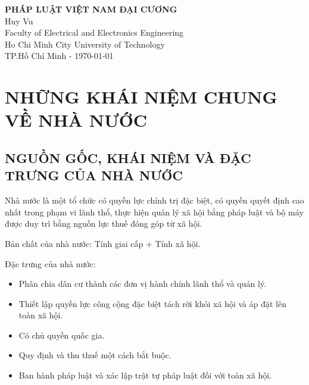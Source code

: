 \documentclass[12pt, a4paper]{article}
\begin{document}
\begin{titlepage}
    \centering
    \vspace*{1in}

    {\LARGE \bfseries PHÁP LUẬT VIỆT NAM ĐẠI CƯƠNG}\\[1.5cm]

    {\large Huy Vu}\\[0.5cm]
    {\large Faculty of Electrical and Electronics Engineering}\\
    {\large Ho Chi Minh City University of Technology}\\[2cm]

    {\large TP.Hồ Chí Minh - \today}

    \vfill
\end{titlepage}
{
  \tableofcontents
}
\newpage
\section{NHỮNG KHÁI NIỆM CHUNG VỀ NHÀ NƯỚC}
\subsection{NGUỒN GỐC, KHÁI NIỆM VÀ ĐẶC TRƯNG CỦA NHÀ NƯỚC}
Nhà nước là một tổ chức có quyền lực chính trị đặc biệt, có quyền quyết định cao nhất trong phạm vi lãnh thổ, thực hiện quản lý xã hội bằng pháp luật và bộ máy được duy trì bằng nguồn lực thuế đóng góp từ xã hội.

Bản chất của nhà nước: Tính giai cấp + Tính xã hội.

Đặc trưng của nhà nước:
\begin{itemize}
  \item Phân chia dân cư thành các đơn vị hành chính lãnh thổ và quản lý.
  \item Thiết lập quyền lực công cộng đặc biệt tách rời khỏi xã hội và áp đặt lên toàn xã hội.
  \item Có chủ quyền quốc gia.
  \item Quy định và thu thuế một cách bắt buộc.
  \item Ban hành pháp luật và xác lập trật tự pháp luật đối với toàn xã hội.
\end{itemize}
\end{document}
